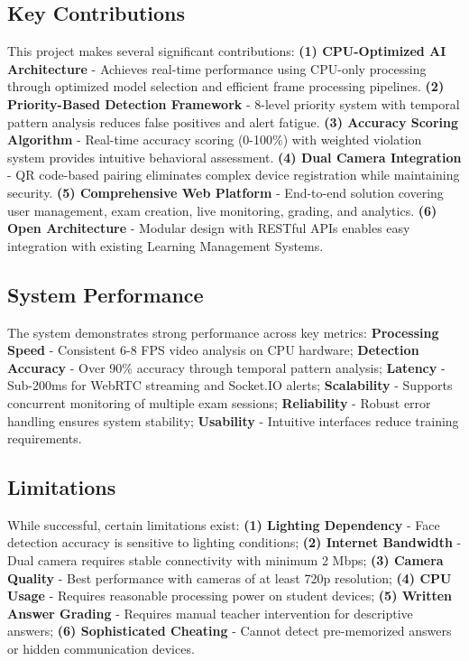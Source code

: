 \subsection{Key Contributions}

This project makes several significant contributions: \textbf{(1) CPU-Optimized AI Architecture} - Achieves real-time performance using CPU-only processing through optimized model selection and efficient frame processing pipelines. \textbf{(2) Priority-Based Detection Framework} - 8-level priority system with temporal pattern analysis reduces false positives and alert fatigue. \textbf{(3) Accuracy Scoring Algorithm} - Real-time accuracy scoring (0-100\%) with weighted violation system provides intuitive behavioral assessment. \textbf{(4) Dual Camera Integration} - QR code-based pairing eliminates complex device registration while maintaining security. \textbf{(5) Comprehensive Web Platform} - End-to-end solution covering user management, exam creation, live monitoring, grading, and analytics. \textbf{(6) Open Architecture} - Modular design with RESTful APIs enables easy integration with existing Learning Management Systems.

\subsection{System Performance}

The system demonstrates strong performance across key metrics: \textbf{Processing Speed} - Consistent 6-8 FPS video analysis on CPU hardware; \textbf{Detection Accuracy} - Over 90\% accuracy through temporal pattern analysis; \textbf{Latency} - Sub-200ms for WebRTC streaming and Socket.IO alerts; \textbf{Scalability} - Supports concurrent monitoring of multiple exam sessions; \textbf{Reliability} - Robust error handling ensures system stability; \textbf{Usability} - Intuitive interfaces reduce training requirements.

\subsection{Limitations}

While successful, certain limitations exist: \textbf{(1) Lighting Dependency} - Face detection accuracy is sensitive to lighting conditions; \textbf{(2) Internet Bandwidth} - Dual camera requires stable connectivity with minimum 2 Mbps; \textbf{(3) Camera Quality} - Best performance with cameras of at least 720p resolution; \textbf{(4) CPU Usage} - Requires reasonable processing power on student devices; \textbf{(5) Written Answer Grading} - Requires manual teacher intervention for descriptive answers; \textbf{(6) Sophisticated Cheating} - Cannot detect pre-memorized answers or hidden communication devices.

